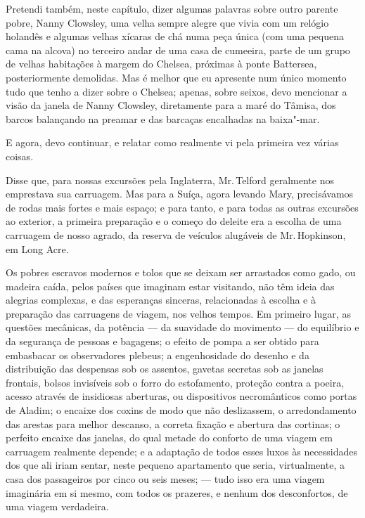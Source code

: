 Pretendi também, neste capítulo, dizer algumas palavras sobre outro
parente pobre, Nanny Clowsley, uma velha sempre alegre que vivia com um
relógio holandês e algumas velhas xícaras de chá numa peça única (com
uma pequena cama na alcova) no terceiro andar de uma casa de cumeeira,
parte de um grupo de velhas habitações à margem do Chelsea, próximas à
ponte Battersea, posteriormente demolidas. Mas é melhor que eu apresente
num único momento tudo que tenho a dizer sobre o Chelsea; apenas, sobre
seixos, devo mencionar a visão da janela de Nanny Clowsley, diretamente
para a maré do Tâmisa, dos barcos balançando na preamar e das barcaças
encalhadas na baixa"-mar.

E agora, devo continuar, e relatar como realmente vi pela primeira vez
várias coisas.

Disse que, para nossas excursões pela Inglaterra, Mr.\,Telford
geralmente nos emprestava sua carruagem. Mas para a Suíça, agora levando
Mary, precisávamos de rodas mais fortes e mais espaço; e para tanto, e
para todas as outras excursões ao exterior, a primeira preparação e o
começo do deleite era a escolha de uma carruagem de nosso agrado, da
reserva de veículos alugáveis de Mr.\,Hopkinson, em Long Acre.

Os pobres escravos modernos e tolos que se deixam ser arrastados como
gado, ou madeira caída, pelos países que imaginam estar visitando, não
têm ideia das alegrias complexas, e das esperanças sinceras,
relacionadas à escolha e à preparação das carruagens de viagem, nos
velhos tempos. Em primeiro lugar, as questões mecânicas, da potência ---
da suavidade do movimento --- do equilíbrio e da segurança de pessoas e
bagagens; o efeito de pompa a ser obtido para embasbacar os observadores
plebeus; a engenhosidade do desenho e da distribuição das despensas sob
os assentos, gavetas secretas sob as janelas frontais, bolsos invisíveis
sob o forro do estofamento, proteção contra a poeira, acesso através de
insidiosas aberturas, ou dispositivos necromânticos como portas de
Aladim; o encaixe dos coxins de modo que não deslizassem, o
arredondamento das arestas para melhor descanso, a correta fixação e
abertura das cortinas; o perfeito encaixe das janelas, do qual metade do
conforto de uma viagem em carruagem realmente depende; e a adaptação de
todos esses luxos às necessidades dos que ali iriam sentar, neste
pequeno apartamento que seria, virtualmente, a casa dos passageiros por
cinco ou seis meses; --- tudo isso era uma viagem imaginária em si mesmo,
com todos os prazeres, e nenhum dos desconfortos, de uma viagem
verdadeira.

